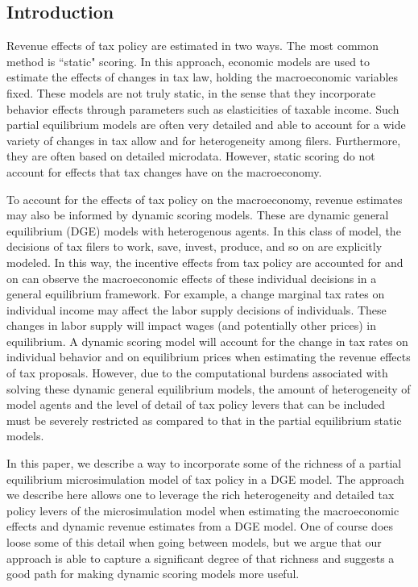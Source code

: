 \documentclass[letterpaper,12pt]{article}
\theoremstyle{definition}
\begin{document}
\begin{spacing}{1.5}

\section{Introduction}\label{SecIntro}

Revenue effects of tax policy are estimated in two ways.  The most common method is ``static" scoring.  In this approach, economic models are used to estimate the effects of changes in tax law, holding the macroeconomic variables fixed.  These models are not truly static, in the sense that they incorporate behavior effects through parameters such as elasticities of taxable income.  Such partial equilibrium models are often very detailed and able to account for a wide variety of changes in tax allow and for heterogeneity among filers.  Furthermore, they are often based on detailed microdata. However, static scoring do not account for effects that tax changes have on the macroeconomy.  

To account for the effects of tax policy on the macroeconomy, revenue estimates may also be informed by dynamic scoring models.  These are dynamic general equilibrium (DGE) models with heterogenous agents.  In this class of model, the decisions of tax filers to work, save, invest, produce, and so on are explicitly modeled. In this way, the incentive effects from tax policy are accounted for and on can observe the macroeconomic effects of these individual decisions in a general equilibrium framework.  For example, a change marginal tax rates on individual income may affect the labor supply decisions of individuals.  These changes in labor supply will impact wages (and potentially other prices) in equilibrium.  A dynamic scoring model will account for the change in tax rates on individual behavior and on equilibrium prices when estimating the revenue effects of tax proposals.  However, due to the computational burdens associated with solving these dynamic general equilibrium models, the amount of heterogeneity of model agents and the level of detail of tax policy levers that can be included must be severely restricted as compared to that in the partial equilibrium static models.

In this paper, we describe a way to incorporate some of the richness of a partial equilibrium microsimulation model of tax policy in a DGE model.  The approach we describe here allows one to leverage the rich heterogeneity and detailed tax policy levers of the microsimulation model when estimating the macroeconomic effects and dynamic revenue estimates from a DGE model.  One of course does loose some of this detail when going between models, but we argue that our approach is able to capture a significant degree of that richness and suggests a good path for making dynamic scoring models more useful.


\end{spacing}
\end{document}
